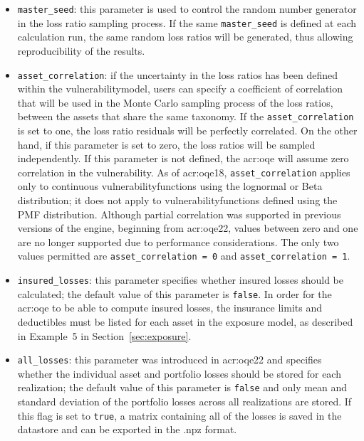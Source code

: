 \begin{itemize}

  \item \Verb+master_seed+: this parameter is used to control the random
    number generator in the loss ratio sampling process. If the same
    \Verb+master_seed+ is defined at each calculation run, the same random loss
    ratios will be generated, thus allowing reproducibility of the results.

  \item \Verb+asset_correlation+: if the uncertainty in the loss ratios
    has been defined within the \gls{vulnerabilitymodel}, users can specify
    a coefficient of correlation that will be used in the Monte Carlo sampling
    process of the loss ratios, between the assets that share the same
    \gls{taxonomy}. If the \Verb+asset_correlation+ is set to one,
    the loss ratio residuals will be perfectly correlated. On the other hand,
    if this parameter is set to zero, the loss ratios will be sampled
    independently. If this parameter is not defined, the
    \glsdesc{acr:oqe} will assume zero correlation in the vulnerability. As of
    \glsdesc{acr:oqe18}, \Verb+asset_correlation+ applies only to continuous
    \glspl{vulnerabilityfunction} using the lognormal or Beta distribution; 
    it does not apply to \glspl{vulnerabilityfunction} defined using the PMF
    distribution. Although partial correlation was supported in previous
    versions of the engine, beginning from \glsdesc{acr:oqe22}, values between
    zero and one are no longer supported due to performance considerations. The
    only two values permitted are \Verb+asset_correlation = 0+ and 
    \Verb+asset_correlation = 1+.

  \item \Verb+insured_losses+: this parameter specifies whether insured losses
    should be calculated; the default value of this parameter is \Verb+false+.
    In order for the \glsdesc{acr:oqe} to be able to compute insured losses, the
    insurance limits and deductibles must be listed for each asset in the 
    exposure model, as described in Example~5 in Section~\ref{sec:exposure}.

  \item \Verb+all_losses+: this parameter was introduced in \glsdesc{acr:oqe22}
    and specifies whether the individual asset and portfolio losses should be
    stored for each realization; the default value of this parameter is
    \Verb+false+ and only mean and standard deviation of the portfolio losses
    across all realizations are stored. If this flag is set to \Verb+true+, a
    matrix containing all of the losses is saved in the datastore and can be
    exported in the .npz format.

\end{itemize}

